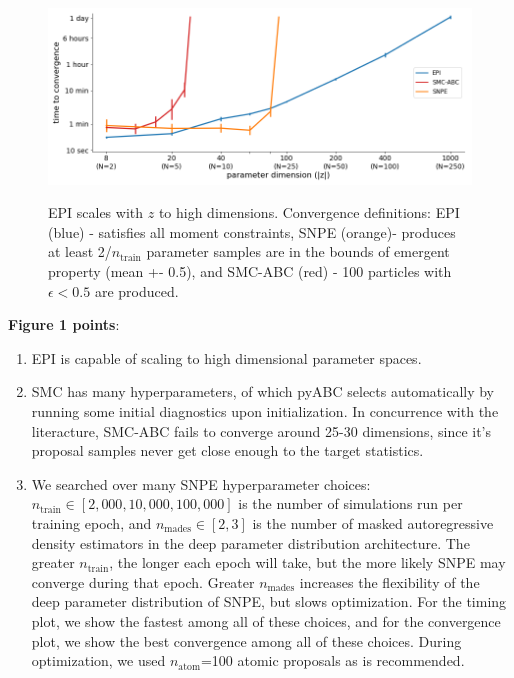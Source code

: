\documentclass[11pt]{article}
\begin{document}
\begin{figure}[h]
\begin{center}
\includegraphics[scale=.5]{figs/epi_both.png} \\
\end{center}
\caption{\small EPI scales with $z$ to high dimensions. 
Convergence definitions: 
EPI (blue) - satisfies all moment constraints, 
SNPE (orange)- produces at least 2/$n_{\text{train}}$ parameter samples are in the bounds of emergent property (mean +- 0.5), 
and SMC-ABC (red) - 100 particles with $\epsilon < 0.5$ are produced.}
\end{figure}

\textbf{Figure 1 points}:
\begin{enumerate}
\item EPI is capable of scaling to high dimensional parameter spaces.
\item SMC has many hyperparameters, of which pyABC selects automatically by running some initial diagnostics upon initialization.
In concurrence with the literacture, SMC-ABC fails to converge around 25-30 dimensions, since it's proposal samples never get close enough to the target statistics.
\item We searched over many SNPE hyperparameter choices: $n_{\text{train}} \in [2,000, 10,000, 100,000]$ is the number of simulations run per training epoch, and $n_{\text{mades}} \in [2, 3]$ is the number of masked autoregressive density estimators in the deep parameter distribution architecture.  
The greater $n_{\text{train}}$, the longer each epoch will take, but the more likely SNPE may converge during that epoch.
Greater $n_{\text{mades}}$ increases the flexibility of the deep parameter distribution of SNPE, but slows optimization.
For the timing plot, we show the fastest among all of these choices, and for the convergence plot, we show the best convergence among all of these choices.
During optimization, we used $n_{\text{atom}}$=100 atomic proposals as is recommended.
\end{enumerate}
\end{document}
